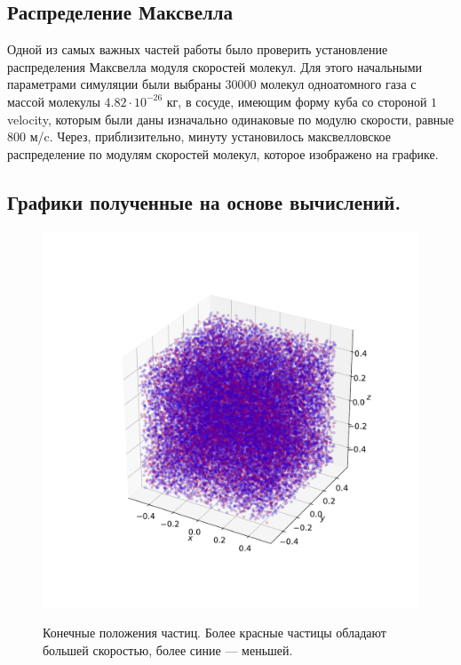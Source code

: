 \documentclass[twoside,twocolumn, 11pt]{article}
\theoremstyle{plain}
\theoremstyle{definition}
\begin{document}
\subsection{Распределение Максвелла}

\indent Одной из самых важных частей работы было проверить установление распределения Максвелла модуля скоростей молекул. Для этого начальными параметрами симуляции были выбраны 30000 молекул одноатомного газа с массой молекулы $4.82 \cdot 10^{-26}$ кг, в сосуде, имеющим форму куба со стороной $1$velocity, которым были даны изначально одинаковые по модулю скорости, равные $800$ м/c. Через, приблизительно, минуту установилось максвелловское распределение по модулям скоростей молекул, которое изображено на графике.\\

\subsection{Графики полученные на основе вычислений.}
\begin{figure}[!h]
    {\includegraphics[width=1\linewidth]{particles}}
    \caption{Конечные положения частиц. Более красные частицы обладают большей скоростью, более синие — меньшей.}
    \end{figure}
\end{document}
